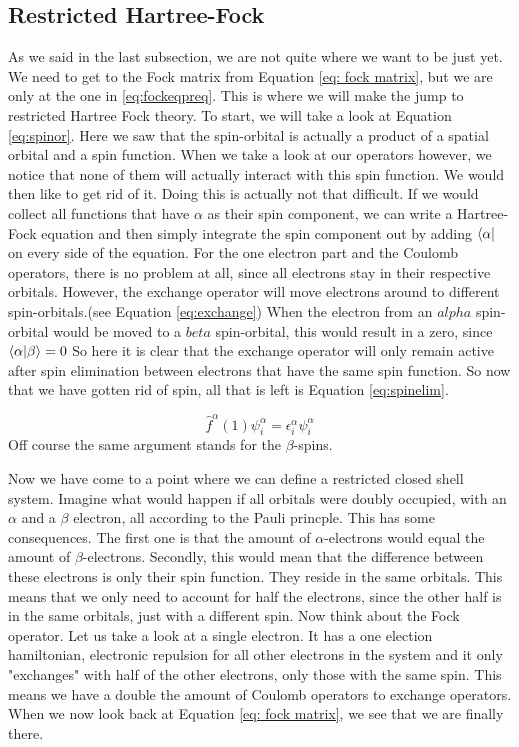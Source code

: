 \subsection{Restricted Hartree-Fock}
\label{subsec:RHF}
As we said in the last subsection, we are not quite where we want to be just yet.
We need to get to the Fock matrix from Equation \ref{eq: fock matrix}, but we are
only at the one in \ref{eq:fockeqpreq}. This is where we will make the jump to
restricted Hartree Fock theory. To start, we will take a look at Equation \ref{eq:spinor}.
Here we saw that the spin-orbital is actually a product of a spatial orbital and
a spin function. When we take a look at our operators however, we notice that none
of them will actually interact with this spin function. We would then like to get rid
of it. Doing this is actually not that difficult. If we would collect all functions
that have $\alpha$ as their spin component, we can write a Hartree-Fock equation and
then simply integrate the spin component out by adding $\bra{\alpha}$ on every
side of the equation. For the one electron part and the Coulomb operators, there is
no problem at all, since all electrons stay in their respective orbitals. However,
the exchange operator will move electrons around to different spin-orbitals.(see 
Equation \ref{eq:exchange}) When the electron from an $alpha$ spin-orbital would
be moved to a $beta$ spin-orbital, this would result in a zero, since $\bra{\alpha}\ket{\beta} = 0$
So here it is clear that the exchange operator will only remain active after spin 
elimination between electrons that have the same spin function. So now that we have
gotten rid of spin, all that is left is Equation \ref{eq:spinelim}.

\begin{equation}\label{eq:spinelim}
    \hat{f}^{\alpha}(1)\psi^{\alpha}_i = \epsilon^{\alpha}_i\psi^{\alpha}_i
\end{equation}
Off course the same argument stands for the $\beta$-spins.

Now we have come to a point where we can define a restricted closed shell system.
Imagine what would happen if all orbitals were doubly occupied, with an $\alpha$
and a $\beta$ electron, all according to the Pauli princple. This has some consequences.
The first one is that the amount of $\alpha$-electrons would equal the amount of
$\beta$-electrons. Secondly, this would mean that the difference between these electrons
is only their spin function. They reside in the same orbitals. This means that we only
need to account for half the electrons, since the other half is in the same orbitals,
just with a different spin. Now think about the Fock operator. Let us
take a look at a single electron. It has a one election hamiltonian, electronic repulsion
for all other electrons in the system and it only "exchanges" with half of the other
electrons, only those with the same spin. This means we have a double the amount of 
Coulomb operators to exchange operators. When we now look back at Equation \ref{eq: fock matrix},
we see that we are finally there.

